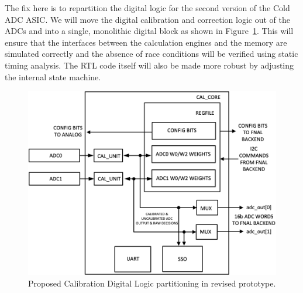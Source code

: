 The fix here is to repartition the digital logic for the second version of the Cold ADC ASIC. We will move the digital calibration and correction logic out of the ADCs and into a single, monolithic digital block as shown in Figure~\ref{fig:autocalBlock_new}. This will ensure that the interfaces between the calculation engines and the memory are simulated correctly and the absence of race conditions will be verified using static timing analysis. The RTL code itself will also be made more robust by adjusting the internal state machine.
\begin{figure}[h]
\centering
\begin{center}
\includegraphics[width=1.0\textwidth]{figures/autocalBlock_new.png}
\end{center}
\caption{Proposed Calibration Digital Logic partitioning in revised prototype.}
\label{fig:autocalBlock_new}
\end{figure}

